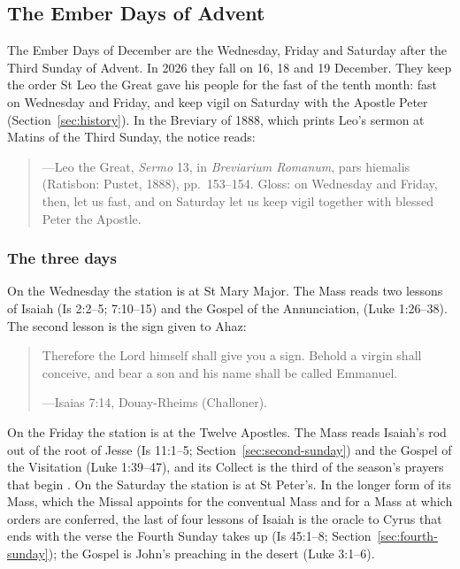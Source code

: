 \subsection{The Ember Days of Advent}\label{sec:ember}

The Ember Days of December are the Wednesday, Friday and Saturday after the Third Sunday of
Advent. In 2026 they fall on 16, 18 and 19 December. They keep the order St Leo the Great gave his people
for the fast of the tenth month: fast on Wednesday and Friday, and keep vigil on Saturday with the
Apostle Peter (Section~\ref{sec:history}). In the Breviary of 1888, which prints Leo's sermon at
Matins of the Third Sunday, the notice reads:

\begin{quote}
\par
{\smallskip\noindent\small ---Leo the Great, \textit{Sermo} 13, in \textit{Breviarium Romanum},
pars hiemalis (Ratisbon: Pustet, 1888), pp.~153--154. Gloss: on Wednesday and Friday, then, let us
fast, and on Saturday let us keep vigil together with blessed Peter the Apostle.\par}
\end{quote}

\subsubsection{The three days}

On the Wednesday the station is at St Mary Major. The Mass reads two lessons of Isaiah (Is 2:2--5;
7:10--15) and the Gospel of the Annunciation,  (Luke 1:26--38). The second
lesson is the sign given to Ahaz:

\begin{quote}
Therefore the Lord himself shall give you a sign. Behold a virgin shall conceive, and bear a son
and his name shall be called Emmanuel.\par
{\smallskip\noindent\small ---Isaias 7:14, Douay-Rheims (Challoner).\par}
\end{quote}

\noindent On the Friday the station is at the Twelve Apostles. The Mass reads Isaiah's rod out of
the root of Jesse (Is 11:1--5; Section~\ref{sec:second-sunday}) and the Gospel of the Visitation
(Luke 1:39--47), and its Collect is the third of the season's prayers that begin
. On the Saturday the station is at St Peter's. In the longer form of its Mass,
which the Missal appoints for the conventual Mass and for a Mass at which orders are conferred,
the last of four lessons of Isaiah is the oracle to Cyrus that ends with the verse the Fourth
Sunday takes up (Is 45:1--8; Section~\ref{sec:fourth-sunday}); the Gospel is John's preaching in
the desert (Luke 3:1--6).

